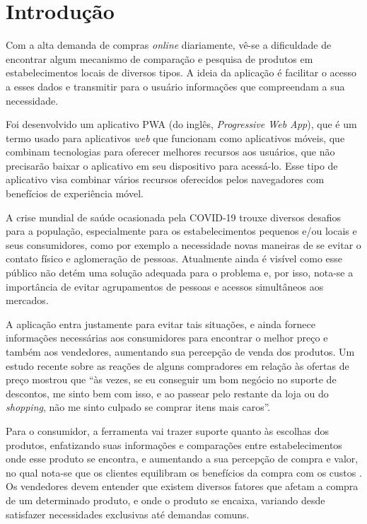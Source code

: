 \section{Introdução}
\label{sec:introducao}

Com a alta demanda de compras \textit{online} diariamente, vê-se a dificuldade de encontrar algum mecanismo de comparação e pesquisa de produtos em estabelecimentos locais de diversos tipos. A ideia da aplicação é facilitar o acesso a esses dados e transmitir para o usuário informações que compreendam a sua necessidade.

Foi desenvolvido um aplicativo PWA (do inglês, \textit{Progressive Web App}), que é um termo usado para aplicativos \textit{web} que funcionam como aplicativos móveis, que combinam tecnologias para oferecer melhores recursos aos usuários, que não precisarão baixar o aplicativo em seu dispositivo para acessá-lo. Esse tipo de aplicativo visa combinar vários recursos oferecidos pelos navegadores com benefícios de experiência móvel. \cite{souza2017pwa}

A crise mundial de saúde ocasionada pela COVID-19 trouxe diversos desafios para a população, especialmente para os estabelecimentos pequenos e/ou locais e seus consumidores, como por exemplo a necessidade novas maneiras de se evitar o contato físico e aglomeração de pessoas. Atualmente ainda é visível como esse público não detém uma solução adequada para o problema e, por isso, nota-se a importância de evitar agrupamentos de pessoas e acessos simultâneos aos mercados.

A aplicação entra justamente para evitar tais situações, e ainda fornece informações necessárias aos consumidores para encontrar o melhor preço e também aos vendedores, aumentando sua percepção de venda dos produtos. Um estudo recente sobre as reações de alguns compradores em relação às ofertas de preço mostrou que ``às vezes, se eu conseguir um bom negócio no suporte de descontos, me sinto bem com isso, e  ao passear pelo restante da loja ou do \textit{shopping}, não me sinto culpado se comprar itens mais caros''. \cite{grewal1998effects}

Para o consumidor, a ferramenta vai trazer suporte quanto às escolhas dos produtos, enfatizando suas informações e comparações entre estabelecimentos onde esse produto se encontra, e aumentando a sua percepção de compra e valor, no qual nota-se que os clientes equilibram os benefícios da compra com os custos \cite{grewal1998effects}. Os vendedores devem entender que existem diversos fatores que afetam a compra de um determinado produto, e onde o produto se encaixa, variando desde satisfazer necessidades exclusivas até demandas comuns. \cite{grewal1998effects}
